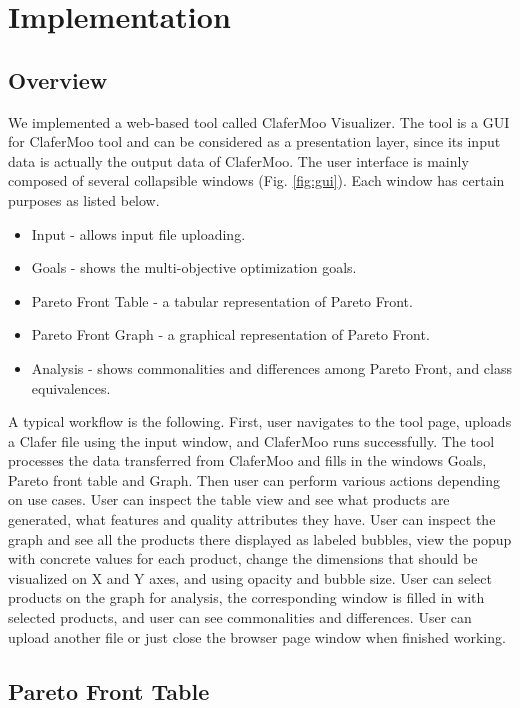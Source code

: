 \documentclass{acm_proc_article-sp}
\begin{document}
\section{Implementation}

\subsection{Overview}

We implemented a web-based tool called ClaferMoo Visualizer. The tool is a GUI for ClaferMoo tool and can be considered as a presentation layer, since its input data is actually the output data of ClaferMoo. The user interface is mainly composed of several collapsible windows (Fig. \ref{fig:gui}). Each window has certain purposes as listed below. 
\begin{itemize}
\item Input - allows input file uploading.
\item Goals - shows the multi-objective optimization goals.
\item Pareto Front Table - a tabular representation of Pareto Front.
\item Pareto Front Graph - a graphical representation of Pareto Front.
\item Analysis - shows commonalities and differences among Pareto Front, and class equivalences.
\end{itemize}

A typical workflow is the following. First, user navigates to the tool page, uploads a Clafer file using the input window, and ClaferMoo runs successfully. The tool processes the data transferred from ClaferMoo and fills in the windows Goals, Pareto front table and Graph. Then user can perform various actions depending on use cases. User can inspect the table view and see what products are generated, what features and quality attributes they have. User can inspect the graph and see all the products there displayed as labeled bubbles, view the popup with concrete values for each product, change the dimensions that should be visualized on X and Y axes, and using opacity and bubble size. User can select products on the graph for analysis, the corresponding window is filled in with selected products, and user can see commonalities and differences. User can upload another file or just close the browser page window when finished working.  

\subsection{Pareto Front Table}
\end{document}
